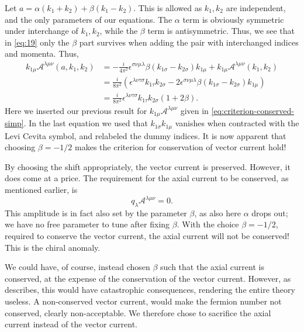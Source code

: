 Let $a=\alpha (k_1+k_2) + \beta (k_1-k_2)$.
This is allowed as $k_1, k_2$ are independent, and the only parameters of our equations.
The $\alpha$ term is obviously symmetric under interchange of $k_1, k_2$, while the $\beta$ term is antisymmetric.
Thus, we see that in \cref{eq:19} only the $\beta $ part survives when adding the pair with interchanged indices and momenta.
Thus,
\begin{equation}
  \begin{split}
  k_{1\mu }\mathcal{A}^{\lambda \mu \nu }(a, k_1, k_2) &=
                                                         -\frac{i}{4\pi^2} \epsilon ^{\sigma \nu \mu \lambda } \beta (k_{1\sigma } - k_{2\sigma })k_{1\mu } + k_{1\mu }\mathcal{A}^{\lambda \mu \nu }(k_1, k_2)\\
                                                       &= \frac{i}{8\pi^2} \left(
                                                         \epsilon ^{\lambda \nu \tau \sigma }k_{1\tau }k_{2\sigma } - 2 \epsilon ^{\sigma \nu \mu \lambda } \beta (k_{1\sigma } - k_{2\sigma })k_{1\mu }\right)\\
  &= \frac{i}{8\pi^2} \epsilon ^{\lambda \nu \tau \sigma } k_{1\tau }k_{2\sigma } (1+ 2\beta ).
  \end{split}
\end{equation}
Here we inserted our previous result for $k_{1\mu }\mathcal{A}^{\lambda \mu \nu }$ given in \cref{eq:criterion-conserved-simp}.
In the last equation we used that $k_{1\sigma }k_{1\mu }$ vanishes when contracted with the Levi Cevita symbol, and relabeled the dummy indices.
It is now  apparent that choosing $\beta = -1 / 2$ makes the criterion for conservation of vector current hold!

By choosing the shift appropriately, the vector current is preserved.
However, it does come at a price.
The requirement for the axial current to be conserved, as mentioned earlier, is
\[
  q_{\lambda } \mathcal{A}^{\lambda  \mu  \nu } = 0.
\]
This amplitude is in fact also set by the parameter $\beta $, as also here $\alpha $ drops out;
we have no free parameter to tune after fixing $\beta $.
With the choice $\beta  = -1 / 2$, required to conserve the vector current, the axial current will not be conserved!
This is the chiral anomaly.

We could have, of course, instead chosen $\beta $ such that the axial current is conserved, at the expense of the conservation of the vector current.
However, as~\textcite{zeeQuantumFieldTheory2010} describes, this would have catastrophic consequences, rendering the entire theory useless.
A non-conserved vector current, would make the fermion number not conserved, clearly non-acceptable.
We therefore chose to sacrifice the axial current instead of the vector current.


